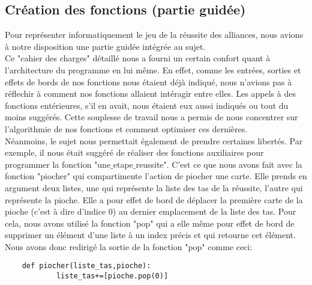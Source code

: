 \documentclass[10pt,a4paper,french,titlepage]{article}
\begin{document}
\subsection{Création des fonctions (partie guidée)}
Pour représenter informatiquement le jeu de la réussite des alliances, nous avions à notre disposition une partie guidée intégrée au sujet.\\
Ce "cahier des charges" détaillé nous a fourni un certain confort quant à l'architecture du programme en lui même. En effet, comme les entrées, 
sorties et effets de bords de nos fonctions nous étaient déjà indiqué, nous n'avions pas à réflechir à comment nos fonctions allaient intéragir entre elles. Les appels à des fonctions entérieures, s'il en avait, nous étaient eux aussi indiqués ou tout du moins suggérés. Cette souplesse de travail nous
a permis de nous concentrer sur l'algorithmie de nos fonctions et comment optimiser ces dernières.\\
\tabto{1cm}Néanmoins, le sujet nous permettait également de prendre certaines libertés. Par exemple, il nous était suggéré de réaliser des fonctions
auxiliaires pour programmer la fonction "une$\_$etape$\_$reussite". C'est ce que nous avons fait avec la fonction "piocher" qui compartimente l'action de 
piocher une carte. Elle prends en argument deux listes, une qui représente la liste des tas de la réussite, l'autre qui représente la pioche. Elle a 
pour effet de bord de déplacer la première carte de la pioche (c'est à dire d'indice 0) au dernier emplacement de la liste des tas. Pour cela, nous 
avons utilisé la fonction "pop" qui a elle même pour effet de bord de supprimer un élément d'une liste à un index précis et qui retourne cet élément.
Nous avons donc redirigé la sortie de la fonction "pop" comme ceci:\\
\begin{lstlisting}
	def piocher(liste_tas,pioche):
    		liste_tas+=[pioche.pop(0)]
\end{lstlisting}
\end{document}
